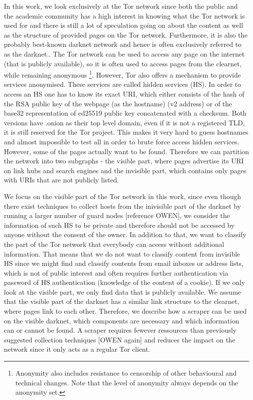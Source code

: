 \documentclass[USenglish,oneside,twocolumn]{article}
\begin{document}
In this work, we look exclusively at the Tor network since both the public and the academic community has a high interest in knowing what the Tor network is used for and there is still a lot of speculation going on about the content as well as the structure of provided pages on the Tor network. Furthermore, it is also the probably best-known darknet network and hence is often exclusively referred to as the darknet.. The Tor network can be used to access any page on the internet (that is publicly available), so it is often used to access pages from the clearnet, while remaining anonymous \footnote{Anonymity also includes resistance to censorship of other behavioural and technical changes. Note that the level of anonymity always depends on the anonymity set.}. 
However, Tor also offers a mechanism to provide services anonymised. These services are called hidden services (HS).  In order to access an HS one has to know its exact URI, which either consists of the hash of the RSA public key of the webpage (as the hostname) (v2 address) or of the base32 representation of ed25519 public key concatenated with a checksum. Both versions have .onion as their top level domain, even if it is not a registered TLD, it is still reserved for the Tor project. This makes it very hard to guess hostnames and almost impossible to test all in order to brute force access hidden services.
However, some of the pages actually want to be found. Therefore we can partition the network into two subgraphs - the visible part, where pages advertise its URI on link hubs and search engines and the invisible part, which contains only pages with URIs that are not publicly listed. 

We focus on the visible part of the Tor network in this work, since even though there exist techniques to collect hosts from the inivisible part of the darknet by running a larger number of guard nodes [reference OWEN], we consider the information of such HS to be private and therefore should not be accessed by anyone without the consent of the owner.
In addition to that, we want to classify the part of the Tor network that everybody can access without additional information. That means that we do not want to classify content from invisible HS since we might find and classify contents from email inboxes or address lists, which is not of public interest and often requires further authentication via password of HS authentication (knowledge of the content of a cookie). If we only look at the visible part, we only find data that is publicly available. We assume that the visible part of the darknet has a similar link structure to the clearnet, where pages link to each other. Therefore, we describe how a scraper can be used on the visible darknet, which components are necessary and which information can or cannot be found. A scraper requires fewever ressources than previously suggested collection techniques [OWEN again] and reduces the impact on the network since it only acts as a regular Tor client.
\end{document}
